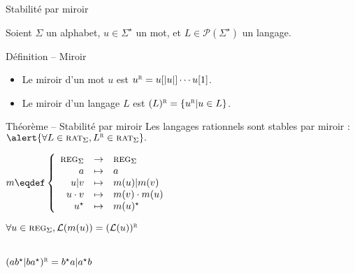 
\begingroup

\begin{frame}{Stabilité par miroir}

  \vspace{-1mm}
  Soient $\Sigma$ un alphabet, $u \in \Sigma^\star$ un mot, et $L \in \mathscr{P}(\Sigma^\star)$ un langage.

  \begin{block}{Définition -- Miroir}
    \begin{itemize}
    \item \vspace{-1mm}Le miroir d'un mot $u$ est $u^{\textsc{r}} = u[|u|]\cdots u[1]$.
    \item \vspace{-1mm}Le miroir d'un langage $L$ est $(L)^{\textsc{r}} = \{u^{\textsc{r}} | u \in L\}$.
    \end{itemize}
  \end{block}
  
  \vspace{-2mm}
  \begin{alertblock}{Théorème -- Stabilité par miroir}
    Les langages rationnels sont stables par miroir : $\alert{\forall L \in \textsc{rat}_\Sigma, L^{\textsc{r}} \in \textsc{rat}_\Sigma}.$
  \end{alertblock}

  \begin{minipage}[t]{.5\textwidth}

    \vspace{3mm}
    $m \eqdef \left\{\begin{array}{rcl}
      \textsc{reg}_\Sigma & \rightarrow & \textsc{reg}_\Sigma\\
      a & \mapsto & a\\
      u | v & \mapsto & m(u) | m(v)\\
      u \cdot v & \mapsto & m(v) \cdot m(u)\\
      u^\star & \mapsto & m(u)^\star\\
      \end{array}\right.$

    $\forall u \in \textsc{reg}_\Sigma, \mathcal{L}(m(u)) = (\mathcal{L}(u))^{\textsc{r}}$
    
    \vspace{3mm}\\ $(ab^\star | ba^\star)^{\textsc{r}} = b^\star a | a^\star b$
      

\end{minipage}
\end{frame}
